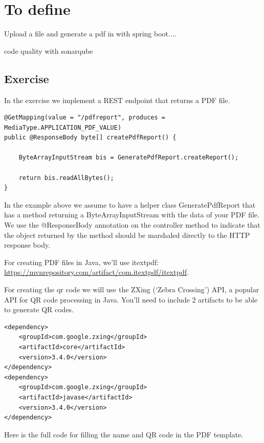 \chapter{To define}


Upload a file and generate a pdf in with spring boot....

code quality with sonarqube


\section{Exercise}

In the exercise we implement a REST endpoint that returns a PDF file.

\begin{lstlisting}
@GetMapping(value = "/pdfreport", produces = MediaType.APPLICATION_PDF_VALUE)
public @ResponseBody byte[] createPdfReport() {

    ByteArrayInputStream bis = GeneratePdfReport.createReport();

	return bis.readAllBytes();
}
\end{lstlisting}

In the example above we assume to have a helper class GeneratePdfReport that has a method returning a ByteArrayInputStream with the data of your PDF file. We use the @ResponseBody annotation on the controller method to indicate that the object returned by the method should be marshaled directly to the HTTP response body.

For creating PDF files in Java, we'll use itextpdf: \url{https://mvnrepository.com/artifact/com.itextpdf/itextpdf}.

For creating the qr code we will use the ZXing (`Zebra Crossing') API, a popular API for QR code processing in Java. You'll need to include 2 artifacts to be able to generate QR codes.

\begin{lstlisting}
<dependency>
	<groupId>com.google.zxing</groupId>
	<artifactId>core</artifactId>
	<version>3.4.0</version>
</dependency>
<dependency>
	<groupId>com.google.zxing</groupId>
	<artifactId>javase</artifactId>
	<version>3.4.0</version>
</dependency>
\end{lstlisting}

Here is the full code for filling the name and QR code in the PDF template.

